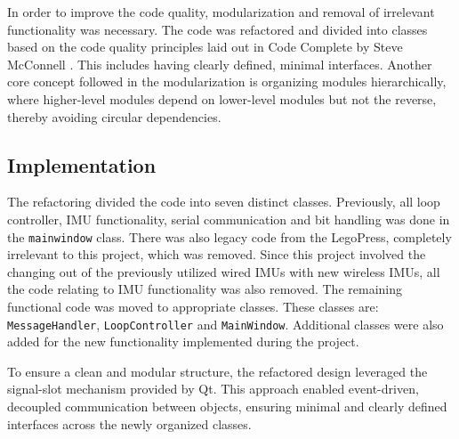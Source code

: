 In order to improve the code quality, modularization and removal of irrelevant functionality was necessary. The code was refactored and divided into classes based on the code quality principles laid out in Code Complete by Steve McConnell \cite{steve_mcconnell_code_nodate}. This includes having clearly defined, minimal interfaces. Another core concept followed in the modularization is organizing modules hierarchically, where higher-level modules depend on lower-level modules but not the reverse, thereby avoiding circular dependencies. 

\subsection{Implementation}
The refactoring divided the code into seven distinct classes. Previously, all loop controller, IMU functionality, serial communication and bit handling was done in the \texttt{mainwindow} class. There was also legacy code from the LegoPress, completely irrelevant to this project, which was removed. Since this project involved the changing out of the previously utilized wired IMUs with new wireless IMUs, all the code relating to IMU functionality was also removed. The remaining functional code was moved to appropriate classes. These classes are: \texttt{MessageHandler}, \texttt{LoopController} and \texttt{MainWindow}. Additional classes were also added for the new functionality implemented during the project.

To ensure a clean and modular structure, the refactored design leveraged the signal-slot mechanism provided by Qt. This approach enabled event-driven, decoupled communication between objects, ensuring minimal and clearly defined interfaces across the newly organized classes.

